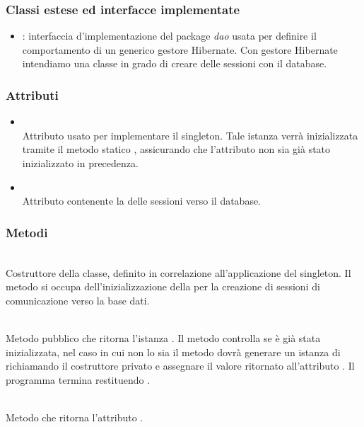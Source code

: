 \subsubsection*{Classi estese ed interfacce implementate}

\begin{itemize}
	\item {}: interfaccia d'implementazione del package \textit{dao} usata per definire il comportamento di un generico gestore Hibernate. Con gestore Hibernate intendiamo una classe in grado di creare delle sessioni con il database.
\end{itemize}

\subsubsection*{Attributi}

\begin{itemize}
	\item{}\\
	Attributo usato per implementare il  singleton. Tale istanza verrà inizializzata tramite il metodo statico , assicurando che l'attributo non sia già stato inizializzato in precedenza.
	\item{}\\
	Attributo contenente la  delle sessioni verso il database.
\end{itemize}

\subsubsection*{Metodi}

\begin{description}
	\item{}\\
	Costruttore della classe, definito  in correlazione all'applicazione del  singleton. Il metodo si occupa dell'inizializzazione della  per la creazione di sessioni di comunicazione verso la base dati.
	
	\item{}\\
	Metodo pubblico che ritorna l'istanza . Il metodo controlla se  è già stata inizializzata, nel caso in cui non lo sia il metodo dovrà generare un istanza di  richiamando il costruttore privato  e assegnare il valore ritornato all'attributo . Il programma termina restituendo .
	
	\item{}\\
	Metodo che ritorna l'attributo .
\end{description}

